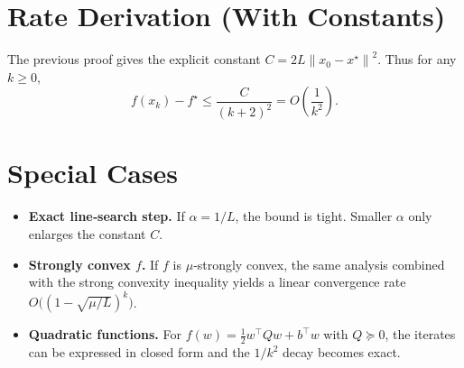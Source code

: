 \documentclass{article}
\newcommand{\norm}[1]{\left\|#1\right\|}
\begin{document}
\section*{Rate Derivation (With Constants)}
The previous proof gives the explicit constant $C=2L\norm{x_0-x^\star}^2$.  
Thus for any $k\ge0$,
\[
f(x_k)-f^\star \le \frac{C}{(k+2)^2}=O\!\left(\frac{1}{k^2}\right).
\]

\section*{Special Cases}
\begin{itemize}
    \item \textbf{Exact line‑search step.} If $\alpha = 1/L$, the bound is tight. Smaller $\alpha$ only enlarges the constant $C$.
    \item \textbf{Strongly convex $f$.} If $f$ is $\mu$‑strongly convex, the same analysis combined with the strong convexity inequality yields a linear convergence rate $O\bigl((1-\sqrt{\mu/L})^k\bigr)$.
    \item \textbf{Quadratic functions.} For $f(w)=\frac12 w^\top Q w+b^\top w$ with $Q\succeq0$, the iterates can be expressed in closed form and the $1/k^2$ decay becomes exact.
\end{itemize}
\end{document}
